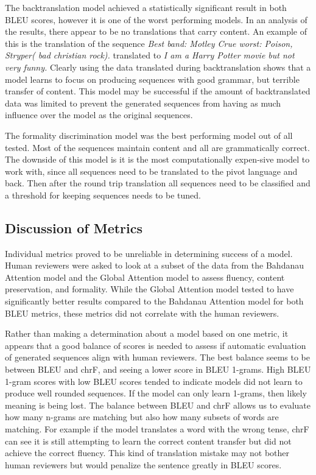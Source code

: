 \documentclass[12pt]{article}
\begin{document}
The backtranslation model achieved a statistically significant result in both BLEU scores, 
however it is one of the worst performing models. In an analysis of the results, there 
appear to be no translations that carry content. An example of this is the translation 
of the sequence \textit{Best band: Motley Crue worst: Poison, Stryper( bad christian rock).} 
translated to \textit{I am a Harry Potter movie but not very funny.} Clearly using the data translated 
during backtranslation shows that a model learns to focus on producing sequences with good grammar, but terrible transfer
of content. This model may be successful if the amount of backtranslated data was limited to prevent 
the generated sequences from having as much influence over the model as the original sequences. \par 

The formality discrimination model was the best performing model out of all tested. Most of the sequences
maintain content and all are grammatically correct. The downside of this model is it is the most computationally
expen-sive model to work with, since all sequences need to be translated to the pivot language and back. 
Then after the round trip translation all sequences need to be classified and a threshold for keeping
sequences needs to be tuned. 

\pagebreak
\subsection{Discussion of Metrics}
Individual metrics proved to be unreliable in determining success of a model.
Human reviewers were asked to look at a subset of the data from the Bahdanau Attention model
and the Global Attention model to assess fluency, content preservation, and formality. While the 
Global Attention model tested to have significantly better results compared to the Bahdanau Attention model
for both BLEU metrics, these metrics did not correlate with the human reviewers. \par

Rather than making a determination about a model based on one metric, it appears that a good balance of scores 
is needed to assess 
if automatic evaluation of generated sequences align with human reviewers. The best balance seems to be 
between BLEU 
and chrF, and seeing a lower score in BLEU 1-grams. High BLEU 1-gram scores with low BLEU scores tended 
to indicate models did not learn to produce well rounded sequences. If the model
can only learn 1-grams, then likely meaning is being lost. The balance between BLEU and chrF allows us
to evaluate how many n-grams are matching but also how many subsets of words are matching. For example
if the model translates a word with the wrong tense, chrF can see it is still attempting to learn 
the correct content transfer but did not achieve the correct fluency. This kind of translation mistake
may not bother human reviewers but would penalize the sentence greatly in BLEU scores. \par
\end{document}
